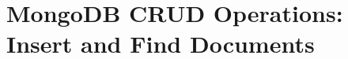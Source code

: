 \documentclass[../main.tex]{subfiles}
\begin{document}
\chapter{MongoDB \gls{CRUD} Operations: Insert and Find Documents}



\printglossaries
\end{document}
